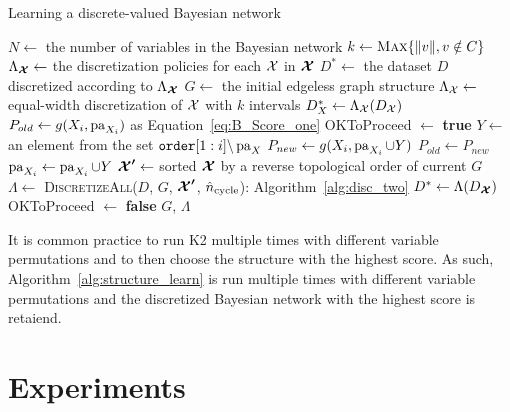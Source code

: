 \begin{algorithm}
  \caption{Learning a discrete-valued Bayesian network}
  \label{alg:structure_learn}
  \begin{algorithmic}[5]
    \State $N \leftarrow$ the number of variables in the Bayesian network
    \State $k \leftarrow \textsc{Max} \{ \|v\|, v\notin C\}$
    \State $\Lambda_{\bm{\mathcal{X}}} \leftarrow$ the discretization policies for each $\mathcal{X}$ in $\bm{\mathcal{X}}$
    \State $D^* \leftarrow $ the dataset $D$ discretized according to $\Lambda_{\bm{\mathcal{X}}}$
    \State $G \leftarrow$ the initial edgeless graph structure
      \State $\Lambda_{\mathcal{X}} \leftarrow$ equal-width discretization of $\mathcal{X}$ with $k$ intervals
      \State $D^*_{X} \leftarrow \Lambda_{\cX} \paren{D_{\cX}}$
    \EndFor
      \State $P_{old} \leftarrow g(X_i,\operatorname{pa}_{X_i})$ as Equation~\ref{eq:B_Score_one}
      \State OKToProceed $\leftarrow$ \textbf{true}
        \State $Y \leftarrow$ an element from the set $\texttt{order}[1:i] \backslash \operatorname{pa}_X$
        \State $P_{new} \leftarrow g(X_i,\operatorname{pa}_{X_i} \cup Y)$
          \State $P_{old} \leftarrow P_{new}$
          \State $\operatorname{pa}_{X_i} \leftarrow \operatorname{pa}_{X_i} \cup Y $
          \State $\bm{\mathcal{X} '} \leftarrow$ sorted $\bm{\mathcal{X}}$ by a reverse topological order of current $G$
          \State $\Lambda \leftarrow$ \textsc{DiscretizeAll}({$D$, $G$, $\bm{\mathcal{X} '}$, $\hat{n}_\text{cycle}$}): Algorithm~\ref{alg:disc_two}
          \State $D^* \leftarrow \Lambda \paren{D_{\bm{\cX }}}$
        \Else
          \State OKToProceed $\leftarrow$ \textbf{false}
        \EndIf
      \EndWhile
    \EndFor
    \State \Return $G$, $\Lambda$
  \EndFunction
  \end{algorithmic}
\end{algorithm}

It is common practice to run K2 multiple times with different variable permutations and to then choose the structure with the highest score.
As such, Algorithm~\ref{alg:structure_learn} is run multiple times with different variable permutations and the discretized Bayesian network with the highest score is retaiend.


\section{Experiments}
\label{sec:experiments}

